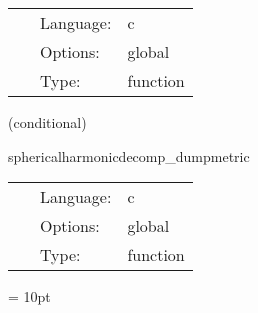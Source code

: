 \hspace{5mm}{\it test } 


\hspace{5mm}

 \begin{tabular*}{160mm}{cll} 
~ & Language:  & c \\ 
~ & Options:  & global \\ 
~ & Type:  & function \\ 
\end{tabular*} 


\vspace{5mm}

   (conditional) 

\hspace{5mm} sphericalharmonicdecomp\_dumpmetric 

\hspace{5mm}{\it extract and decompose spacetime metric } 


\hspace{5mm}

 \begin{tabular*}{160mm}{cll} 
~ & Language:  & c \\ 
~ & Options:  & global \\ 
~ & Type:  & function \\ 
\end{tabular*} 



\vspace{5mm}\parskip = 10pt 

